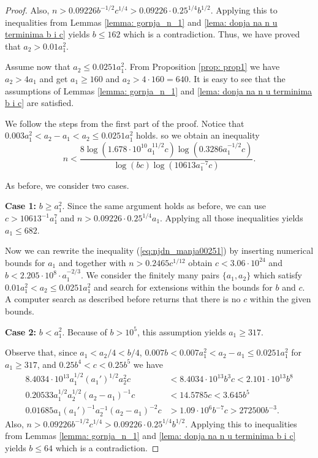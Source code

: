 \documentclass[10pt,a4paper]{amsart}
\begin{document}
\begin{proof}
Also, $n>0.09226b^{-1/2}c^{1/4}>0.09226\cdot 0.25^{1/4}b^{1/2}$. Applying this to inequalities from Lemmas \ref{lemma: gornja_n_1} and \ref{lema: donja na n u terminima b i c} yields $b\leq 162$ which is a contradiction. Thus, we have proved that $a_2>0.01a_1^2$.


Assume now that $a_2 \leq 0.0251a_1^2$. From Proposition \ref{prop: prop1} we have $a_2>4a_1$ and get $a_1\geq 160$ and $a_2 > 4\cdot 160=640$. It is easy to see that the assumptions of Lemmas \ref{lemma: gornja_n_1} and \ref{lema: donja na n u terminima b i c} are satisfied.

We follow the steps from the first part of the proof.
    Notice that $0.003a_1^2<a_2-a_1<a_2\leq0.0251a_1^2$ holds. 
so we obtain an inequality
\begin{equation}\label{eq:njdn_manja00251}
    n<\frac{8\log(1.678\cdot 10^{10}a_1^{11/2}c)\log(0.3286a_1^{-1/2}c)}{\log(bc)\log(10613a_1^{-7}c)}.
\end{equation}

As before, we consider two cases.

\textbf{Case 1:} $b \geq a_1^2$. Since the same argument holds as before, 
 we can use $c>10613^{-1}a_1^7$ and $n>0.09226\cdot 0.25^{1/4}a_1$. Applying all those inequalities yields $a_1\leq 682$. 

Now we can rewrite the inequality (\ref{eq:njdn_manja00251}) by inserting numerical bounds for $a_1$ and together with $n>0.2465c^{1/12}$ obtain $c<3.06\cdot 10^{24}$ and $b<2.205\cdot 10^{8}\cdot a_1^{-2/3}$. We consider the finitely many pairs $\{a_1,a_2\}$ which satisfy $ 0.01a_1^2<a_2\leq 0.0251a_1^2$ and search for extensions within the bounds for $b$ and $c$. A computer search as described before returns that there is no $c$ within the given bounds.

\textbf{Case 2:} $b<a_1^2$. 
Because of $b>10^5$, this assumption yields $a_1 \geq 317$. 


Observe that, since $a_1<a_2/4<b/4$, $0.007b<0.007a_1^2<a_2-a_1\leq 0.0251a_1^2$ for $a_1\geq 317$, and $0.25b^4<c<0.25b^5$ we have
   \begin{align*}
 8.4034\cdot 10^{13}a_1^{1/2}(a_1')^{1/2}a_2^2c&<8.4034\cdot 10^{13}b^3c<2.101\cdot 10^{13}b^8\\
 0.20533a_1^{1/2}a_2^{1/2}(a_2-a_1)^{-1}c&<14.5785c<3.645b^5\\
 0.01685a_1(a_1')^{-1}a_2^{-1}(a_2-a_1)^{-2}c&>1.09\cdot 10^6b^{-7}c>272500b^{-3}. 
\end{align*}
Also, $n>0.09226b^{-1/2}c^{1/4}>0.09226\cdot 0.25^{1/4}b^{1/2}$. Applying this to inequalities from Lemmas \ref{lemma: gornja_n_1} and \ref{lema: donja na n u terminima b i c} yields $b\leq 64$ which is a contradiction. 
\end{proof}
\end{document}
